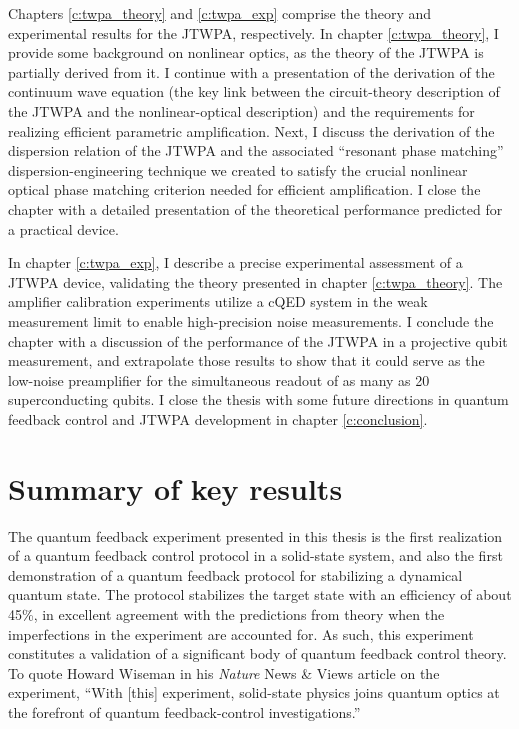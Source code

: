Chapters \ref{c:twpa_theory} and \ref{c:twpa_exp} comprise the theory and experimental results for the JTWPA, respectively.  In chapter \ref{c:twpa_theory}, I provide some background on nonlinear optics, as the theory of the JTWPA is partially derived from it.  I continue with a presentation of the derivation of the continuum wave equation (the key link between the circuit-theory description of the JTWPA and the nonlinear-optical description) and the requirements for realizing efficient parametric amplification.  Next, I discuss the derivation of the dispersion relation of the JTWPA and the associated ``resonant phase matching'' dispersion-engineering technique we created to satisfy the crucial nonlinear optical phase matching criterion needed for efficient amplification.  I close the chapter with a detailed presentation of the theoretical performance predicted for a practical device.

In chapter \ref{c:twpa_exp}, I describe a precise experimental assessment of a JTWPA device, validating the theory presented in chapter \ref{c:twpa_theory}.  The amplifier calibration experiments utilize a cQED system in the weak measurement limit to enable high-precision noise measurements.  I conclude the chapter with a discussion of the performance of the JTWPA in a projective qubit measurement, and extrapolate those results to show that it could serve as the low-noise preamplifier for the simultaneous readout of as many as 20 superconducting qubits.  I close the thesis with some future directions in quantum feedback control and JTWPA development in chapter \ref{c:conclusion}.

\section{Summary of key results}

The quantum feedback experiment presented in this thesis is the first realization of a quantum feedback control protocol in a solid-state system, and also the first demonstration of a quantum feedback protocol for stabilizing a dynamical quantum state.  The protocol stabilizes the target state with an efficiency of about 45\%, in excellent agreement with the predictions from theory when the imperfections in the experiment are accounted for.  As such, this experiment constitutes a validation of a significant body of quantum feedback control theory.  To quote Howard Wiseman in his \textit{Nature} News \& Views article on the experiment, ``With [this] experiment, solid-state physics joins quantum optics at the forefront of quantum feedback-control investigations.'' \cite{Wiseman2012}

